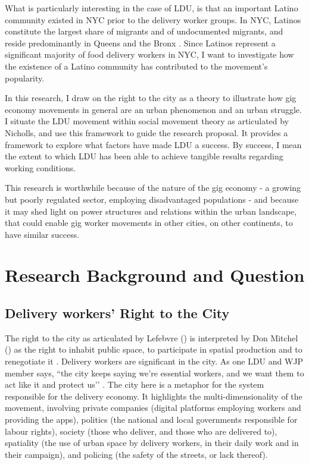 \documentclass{article}[12pt]
\begin{document}
What is particularly interesting in the case of LDU, is that an important Latino community existed in NYC prior to the delivery worker groups. In NYC, Latinos constitute the largest share of migrants and of undocumented migrants, and reside predominantly in Queens and the Bronx \parencite{nycimmigrantpopulation2021}. Since Latinos represent a significant majority of food delivery workers in NYC, I want to investigate how the existence of a Latino community has contributed to the movement’s popularity.

In this research, I draw on the right to the city as a theory to illustrate how gig economy movements in general are an urban phenomenon and an urban struggle.
I situate the LDU movement within social movement theory as articulated by Nicholls, and use this framework to guide the research proposal. It provides a framework to explore what factors have made LDU a success. By success, I mean the extent to which LDU has been able to achieve tangible results regarding working conditions.


This research is worthwhile because of the nature of the gig economy - a growing but poorly regulated sector, employing disadvantaged populations - and because it may shed light on power structures and relations within the urban landscape, that could enable gig worker movements in other cities, on other continents, to have similar success.

\section{Research Background and Question}

\subsection{Delivery workers’ Right to the City}

The right to the city as articulated by Lefebvre (\citeyear{lefebvre1995writings}) is interpreted by Don Mitchel (\citeyear{mitchell2003right}) as the right to inhabit public space, to participate in spatial production and to renegotiate it \parencite{lee2018delivering}. Delivery workers are significant in the city. As one LDU and WJP member says, ``the city keeps saying we’re essential workers, and we want them to act like it and protect us’’ \parencite{ldutestimonials}. The city here is a metaphor for the system responsible for the delivery economy. It highlights the multi-dimensionality of the movement, involving private companies (digital platforms employing workers and providing the apps), politics (the national and local governments responsible for labour rights), society (those who deliver, and those who are delivered to), spatiality (the use of urban space by delivery workers, in their daily work and in their campaign), and policing (the safety of the streets, or lack thereof).
\end{document}
